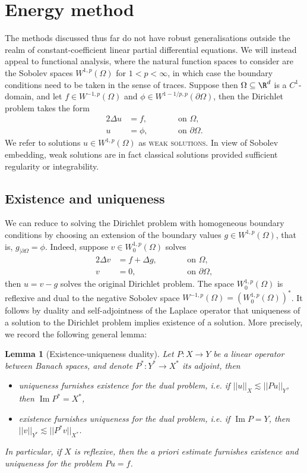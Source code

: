 \documentclass[reqno]{amsart}
\newtheorem{lemma}[theorem]{Lemma}
\theoremstyle{definition}
\theoremstyle{remark}
\renewcommand{\emph}{\textsc}
\renewcommand{\Im}{\operatorname{Im}}
\begin{document}
\section{Energy method}

The methods discussed thus far do not have robust generalisations outside the realm of constant-coefficient linear partial differential equations. We will instead appeal to functional analysis, where the natural function spaces to consider are the Sobolev spaces $W^{1, p} (\Omega)$ for $1 < p < \infty$, in which case the boundary conditions need to be taken in the sense of traces. Suppose then $\Omega \subseteq \R^d$ is a $C^1$-domain, and let $f \in W^{-1, p} (\Omega)$ and $\phi \in W^{1-1/p, p} (\partial \Omega)$, then the Dirichlet problem takes the form
	\begin{alignat*}{2}
		\Delta u
			&= f, \qquad  && \text{on } \Omega, \\
		u
			&= \phi,	\qquad && \text{on } \partial \Omega.
	\end{alignat*} 
We refer to solutions $u \in W^{1,p} (\Omega)$ as \emph{weak solutions}. In view of Sobolev embedding, weak solutions are in fact classical solutions provided sufficient regularity or integrability. 

\subsection{Existence and uniqueness}

We can reduce to solving the Dirichlet problem with homogeneous boundary conditions by choosing an extension of the boundary values $g \in W^{1, p} (\Omega)$, that is, $g_{|\partial \Omega} = \phi$. Indeed, suppose $v \in W^{1, p}_0 (\Omega)$ solves
\begin{alignat*}{2}
		\Delta v
			&= f + \Delta g, \qquad  && \text{on } \Omega, \\
		v
			&= 0,	\qquad && \text{on } \partial \Omega,
	\end{alignat*} 
then $u = v - g$ solves the original Dirichlet problem. The space $W^{1, p}_0 (\Omega)$ is reflexive and dual to the negative Sobolev space $W^{-1, p} (\Omega) = (W^{1, p}_0 (\Omega))^*$. It follows by duality and self-adjointness of the Laplace operator that uniqueness of a solution to the Dirichlet problem implies existence of a solution. More precisely, we record the following general lemma:

\begin{lemma}[Existence-uniqueness duality]
	Let $P : X \to Y$ be a linear operator between Banach spaces, and denote $P^* : Y^* \to X^*$ its adjoint, then 
		\begin{itemize}
			\item uniqueness furnishes existence for the dual problem, i.e. if $||u||_X \lesssim ||Pu||_Y$, then $\Im P^* = X^*$,
			\item existence furnishes uniqueness for the dual problem, i.e. if $\Im P = Y$, then $||v||_{Y^*} \lesssim ||P^* v||_{X^*}$. 
		\end{itemize}
	In particular, if $X$ is reflexive, then the a priori estimate furnishes existence and uniqueness for the problem $Pu = f$. 	
\end{lemma}
\end{document}
